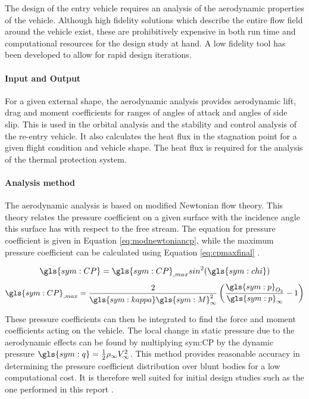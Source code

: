 The design of the entry vehicle requires an analysis of the aerodynamic properties of the vehicle. Although high fidelity solutions which describe the entire flow field around the vehicle exist, these are prohibitively expensive in both run time and computational resources for the design study at hand. A low fidelity tool has been developed to allow for rapid design iterations. 


\paragraph{Input and Output}
For a given external shape, the aerodynamic analysis provides aerodynamic lift, drag and moment coefficients for ranges of angles of attack and angles of side slip. This is used in the orbital analysis and the stability and control analysis of the re-entry vehicle. It also calculates the heat flux in the stagnation point for a given flight condition and vehicle shape. The heat flux is required for the analysis of the thermal protection system. 

\paragraph{Analysis method}
The aerodynamic analysis is based on modified Newtonian flow theory. This theory relates the pressure coefficient on a given surface with the incidence angle this surface has with respect to the free stream. The equation for pressure coefficient is given in Equation \ref{eq:modnewtoniancp}, while the maximum pressure coefficient can be calculated using Equation \ref{eq:cpmaxfinal} \cite{AndersonJr.2006}.

\begin{multicols}{2}
	\begin{equation}
		\gls{sym:CP}=\gls{sym:CP}_{,max}sin^{2}(\gls{sym:chi})
		\label{eq:modnewtoniancp}
	\end{equation} \break
	\begin{equation}
		\gls{sym:CP}_{,max} = \frac{2}{\gls{sym:kappa} \gls{sym:M}_{\infty}^{2}}\left(\frac{\gls{sym:p}_{O_{2}}}{\gls{sym:p}_{\infty}}-1\right)
		\label{eq:cpmaxfinal}
	\end{equation}
\end{multicols}

These pressure coefficients can then be integrated to find the force and moment coefficients acting on the vehicle. The local change in static pressure due to the aerodynamic effects can be found by multiplying \gls{sym:CP} by the dynamic pressure $\gls{sym:q}=\frac{1}{2}\rho_{\infty}V_{\infty}^{2}$. This method provides reasonable accuracy in determining the pressure coefficient distribution over blunt bodies for a low computational cost. It is therefore well suited for initial design studies such as the one performed in this report \cite{AndersonJr.2006}.

